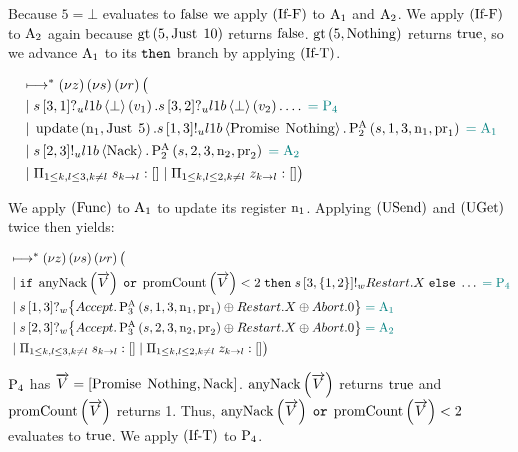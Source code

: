 Because $5 = \bot$ evaluates to $\False$ we apply $\RIfF$ to $\Acceptor{1}$ and $\Acceptor{2}$.
We apply $\RIfF$ to $\Acceptor{2}$ again because $\greaterThan{5}{\Just{10}}$ returns $\False$.
$\greaterThan{5}{\Nothing}$ returns $\True$, so we advance $\Acceptor{1}$ to its $\ThenName$ branch by applying $\RIfT$.

\begin{align*}
&\mapstostar\NuChannels\big (\\
&\Or
    \ReceiveUnreliableP{\ChannelS}{3}{1}{\LOneB}{\bot}{v_1}.
    \ReceiveUnreliableP{\ChannelS}{3}{2}{\LOneB}{\bot}{v_2}.
    \ldots
    \comment{= \Proposer{4}}\\
&\Or
    \update{\NumberRegister_1}{\Just{5}}.
    \SendUnreliableP{\ChannelS}{1}{3}{\LOneB}{\Promise{\Nothing}}.
    \PaTwo{\ChannelS, 1, 3, \NumberRegister_1, \ProposalRegister_1}
    \comment{= \Acceptor{1}}\\
&\Or
    \SendUnreliableP{\ChannelS}{2}{3}{\LOneB}{\Nack}.
    \PaTwo{\ChannelS, 2, 3, \NumberRegister_2, \ProposalRegister_2}
    \comment{= \Acceptor{2}}\\
&\Or \InnerSessionQueues{\ChannelS}
\Or \OuterSessionQueues
\big )
\end{align*}

We apply $\RSideEffect$ to $\Acceptor{1}$ to update its register $\NumberRegister_1$.
Applying $\RUsend$ and $\RUget$ twice then yields:

\begin{align*}
&\mapstostar\NuChannels\big (\\
&\Or
    \If \anyNack{\VectorV} \tOr \promiseCount{\VectorV} < 2
    \;\Then \SendWeaklyP{\ChannelS}{3}{\Curly{1, 2}}{\Restart}. \RecursionVariable
    \;\Else \ldots
    \comment{= \Proposer{4}}\\
&\Or
    \ReceiveWeaklyP{\ChannelS}{1}{3}{
        \Accept. \PaThree{\ChannelS, 1, 3, \NumberRegister_1, \ProposalRegister_1} \oplus \Restart. \RecursionVariable \oplus \Abort . \End
    }
    \comment{= \Acceptor{1}}\\
&\Or
    \ReceiveWeaklyP{\ChannelS}{2}{3}{
        \Accept. \PaThree{\ChannelS, 2, 3, \NumberRegister_2, \ProposalRegister_2} \oplus \Restart. \RecursionVariable \oplus \Abort . \End
    }
    \comment{= \Acceptor{2}}\\
&\Or \InnerSessionQueues{\ChannelS}
\Or \OuterSessionQueues
\big )
\end{align*}

$\Proposer{4}$ has $\VectorV = \Bracket{\Promise{\Nothing}, \Nack}$.
$\anyNack{\VectorV}$ returns $\True$ and $\promiseCount{\VectorV}$ returns 1.
Thus, $\anyNack{\VectorV} \tOr \promiseCount{\VectorV} < 2$ evaluates to $\True$.
We apply $\RIfT$ to $\Proposer{4}$.

